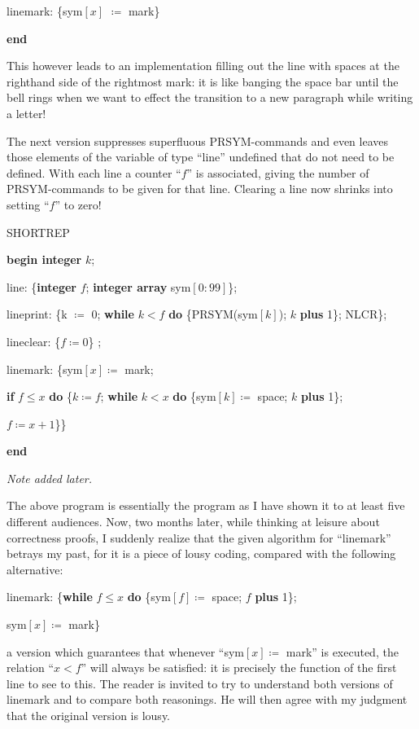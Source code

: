 \noindent
\quad linemark: \{sym$[x]$ $\coloneq$ mark\}

\noindent
\textbf{end}

This however leads to an implementation filling out the line with spaces at the righthand side of the rightmost mark: it is like banging the space bar until the bell rings when we want to effect the transition to a new paragraph while writing a letter!

The next version suppresses superfluous PRSYM-commands and even leaves those elements of the variable of type ``line'' undefined that do not need to be defined. With each line a counter ``$f$'' is associated, giving the number of PRSYM-commands to be given for that line. Clearing a line now shrinks into setting ``$f$'' to zero!

\noindent
SHORTREP

\noindent
\textbf{begin integer} $k$;

\noindent
\quad line: \{\textbf{integer} $f$; \textbf{integer array} sym$[0 : 99]$\};

\noindent
\quad lineprint: \{k $\coloneq$ 0; \textbf{while} $k < f$ \textbf{do} \{PRSYM(sym$[k]$); $k$ \textbf{plus} 1\}; NLCR\};

\noindent
\quad lineclear: \{$f \coloneq 0$\} ;

\noindent
\quad linemark: \{sym$[x] \coloneq$ mark;

\noindent
\quad \textbf{if} $f \leqslant x$ \textbf{do} \{$k \coloneq f$; \textbf{while} $k < x$ \textbf{do} \{sym$[k] \coloneq$ space; $k$ \textbf{plus} 1\};

\noindent
\quad \quad $f \coloneq x + 1$\}\}

\noindent
\textbf{end}

\noindent
\textit{Note added later.}

The above program is essentially the program as I have shown it to at least five different audiences. Now, two months later, while thinking at leisure about correctness proofs, I suddenly realize that the given algorithm for ``linemark'' betrays my past, for it is a piece of lousy coding, compared with the following alternative:

linemark: \{\textbf{while} $f \leqslant x$ \textbf{do} \{sym$[f] \coloneq$ space; $f$ \textbf{plus} 1\};
	
\quad sym$[x] \coloneq$ mark\}

\noindent
a version which guarantees that whenever ``sym$[x] \coloneq$ mark'' is executed, the relation ``$x < f$'' will always be satisfied: it is precisely the function of the first line to see to this. The reader is invited to try to understand both versions of linemark and to compare both reasonings. He will then agree with my judgment that the original version is lousy.

